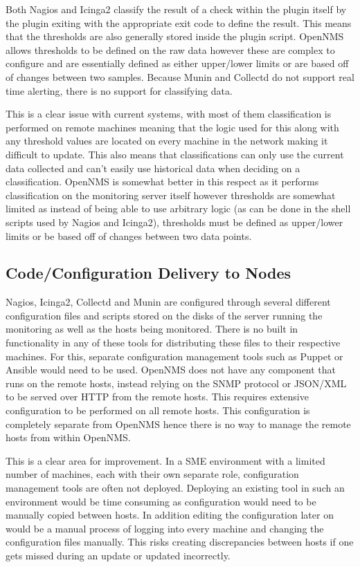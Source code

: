 \documentclass[bsc,deptreport,twoside,parskip,singlespacing,notimes]{infthesis}
\begin{document}
	Both Nagios and Icinga2 classify the result of a check within the plugin itself
	by the plugin exiting with the appropriate exit code to define the result. This
	means that the thresholds are also generally stored inside the plugin script.
	OpenNMS allows thresholds to be defined on the raw data however these are
	complex to configure and are essentially defined as either upper/lower limits
	or are based off of changes between two samples. Because Munin and Collectd do
	not support real time alerting, there is no support for classifying data.


	This is a clear issue with current systems, with most of them classification is
	performed on remote machines meaning that the logic used for this along with
	any threshold values are located on every machine in the network making it
	difficult to update. This also means that classifications can only use the
	current data collected and can't easily use historical data when deciding on a
	classification.  OpenNMS is somewhat better in this respect as it performs
	classification on the monitoring server itself however thresholds are somewhat
	limited as instead of being able to use arbitrary logic (as can be done in
	the shell scripts used by Nagios and Icinga2), thresholds must be defined as
	upper/lower limits or be based off of changes between two data points.

\subsection{Code/Configuration Delivery to Nodes}

	Nagios, Icinga2, Collectd and Munin are configured through several different
	configuration files and scripts stored on the disks of the server running the
	monitoring as well as the hosts being monitored.  There is no built in
	functionality in any of these tools for distributing these files to their
	respective machines.  For this, separate configuration management tools such as
	Puppet or Ansible would need to be used.  OpenNMS does not have any component
	that runs on the remote hosts, instead relying on the SNMP protocol or JSON/XML
	to be served over HTTP from the remote hosts.  This requires extensive
	configuration to be performed on all remote hosts.  This configuration is
	completely separate from OpenNMS hence there is no way to manage the remote
	hosts from within OpenNMS.


	This is a clear area for improvement. In a SME environment with a
	limited number of machines, each with their own separate role, configuration
	management tools are often not deployed.  Deploying an existing tool
	in such an environment would be time consuming as configuration would need
	to be manually copied between hosts. In addition editing the configuration later on
	would be a manual process of logging into every machine and changing the
	configuration files manually. This risks creating discrepancies between
	hosts if one gets missed during an update or updated incorrectly.
\end{document}
